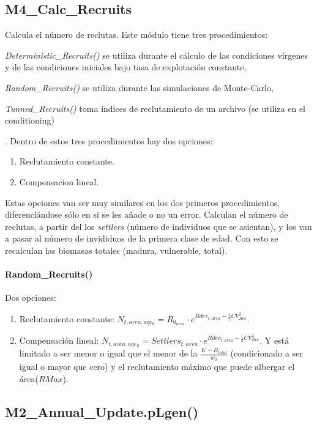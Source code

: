 		\subsection{M4\_Calc\_Recruits}
			Calcula el número de reclutas. Este módulo tiene tres procedimientos:\begin{inparaenum}[(i)] \item \emph{Deterministic\_Recruits()} se utiliza durante el cálculo de las condiciones vírgenes y de las condiciones iniciales bajo tasa de explotación constante, \item \emph{Random\_Recruits()} se utiliza durante las simulaciones de Monte-Carlo, \item \emph{Tunned\_Recruits()} toma índices de reclutamiento de un archivo (se utiliza en el conditioning) \end{inparaenum}.
			Dentro de estos tres procedimientos hay dos opciones: 
					\begin{enumerate}
						\item Reclutamiento constante. 
						\item Compensacion lineal.
					\end{enumerate}
			Estas opciones van ser muy similares en los dos primeros procedimientos, diferenciándose sólo en si se les añade o no un error. Calculan el número de reclutas, a partir del los \emph{settlers} (número de individuos que se asientan), y los van a pasar al número de invididuos de la primera clase de edad. Con esto se recalculan las biomasas totales (madura, vulnerable, total).
			\paragraph{Random\_Recruits()} 
				Dos opciones: 
					\begin{enumerate}
						\item Reclutamiento constante: $N_{t,area,age_{0}}= R_{0_{area}} \cdot e^{Rdev_{t,area}- \frac{1}{2} CV_{Rec}^2}$.
						\item Compensación lineal: $N_{t,area,age_{0}}=Settlers_{t, area} \cdot e^{Rdev_{t,area}- \frac{1}{2} CV_{Rec}^2}$. Y está limitado a ser menor o igual que el menor de la $\frac{K - B_{total}}{w_0}$ (condicionado a ser igual o mayor que cero) y el reclutamiento máximo que puede albergar el área($RMax$).
					\end{enumerate}
				
			
		\subsection{M2\_Annual\_Update.pLgen()}
